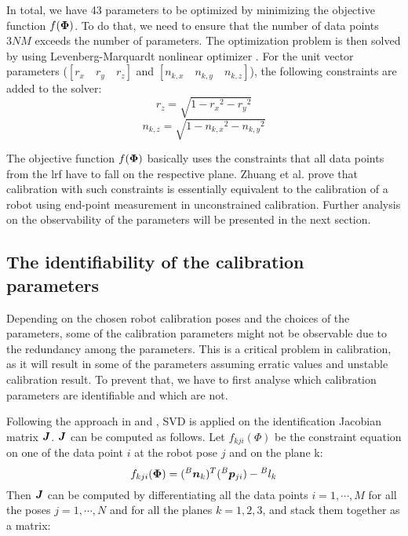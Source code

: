 In total, we have 43 parameters to be optimized by minimizing the objective function $f(\vb*{\Phi})$. To do that, we need to ensure that the number of data points $3NM$ exceeds the number of parameters. The optimization problem is then solved by using Levenberg-Marquardt nonlinear optimizer \cite{Newville2014}. For the unit vector parameters ($[r_x \quad r_y \quad r_z ]$ and  $[n_{k,x} \quad n_{k,y} \quad n_{k,z}]$), the following constraints are added to the solver:
\begin{equation}
\label{eq:10}
{r_z} = \sqrt{1 - {r_x}^2 - {r_y}^2}
\end{equation}
\begin{equation}
\label{eq:11}
n_{k,z} = \sqrt{1 - {n_{k,x}}^2 - {n_{k,y}}^2}
\end{equation}


The objective function $f(\vb*{\Phi})$ basically uses the constraints that all data points from the \ac{lrf} have to fall on the respective plane. Zhuang et al. \cite{Zhuang1999} prove that calibration with such constraints is essentially equivalent to the calibration of a robot using end-point measurement in unconstrained calibration. Further analysis on the observability of the parameters will be presented in the next section. 

\subsection{The identifiability of the calibration parameters}
\label{sec:third_step}

Depending on the chosen robot calibration poses and the choices of the parameters, some of the calibration parameters might not be observable due to the redundancy among the parameters. This is a critical problem in calibration, as it will result in some of the parameters assuming erratic values and unstable calibration result. To prevent that, we have to first analyse which calibration parameters are identifiable and which are not. 

Following the approach in \cite{Hollerbach1996} and \cite{Joubair2015}, SVD is applied on the identification Jacobian matrix $\vb*{J}$. $\vb*{J}$ can be computed as follows. Let  $f_{kji}(\Phi)$ be the constraint equation on one of the data point $i$ at the robot pose $j$ and on the plane k:
\begin{equation}
 f_{kji}(\vb*{\Phi}) =  ({^B}\vb*{n}_k) ^T ({^B}\vb*{p}_{ji}) - {^B}l_k
\end{equation}
Then $\vb*{J}$ can be computed by differentiating all the data points $i = 1, \cdots, M$ for all the poses $j = 1, \cdots, N$ and for all the planes $k=1,2,3$, and stack them together as a matrix:

